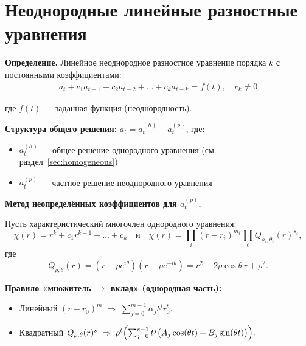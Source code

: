 \section{Неоднородные линейные разностные уравнения}\label{sec:inhomogeneous}

\begin{center}
\end{center}

\textbf{Определение.} Линейное неоднородное разностное уравнение порядка $k$ с постоянными коэффициентами:
\begin{align}
a_t + c_1 a_{t-1} + c_2 a_{t-2} + \dots + c_k a_{t-k} = f(t), \quad c_k \neq 0
\end{align}

где $f(t)$ — заданная функция (неоднородность).

\textbf{Структура общего решения:} $a_t = a_t^{(h)} + a_t^{(p)}$, где:
\begin{itemize}
\item $a_t^{(h)}$ — общее решение однородного уравнения (см. раздел~\ref{sec:homogeneous})
\item $a_t^{(p)}$ — частное решение неоднородного уравнения
\end{itemize}

\textbf{Метод неопределённых коэффициентов для $a_t^{(p)}$.}

Пусть характеристический многочлен однородного уравнения:
\[
\chi(r) = r^k + c_1 r^{k-1} + \dots + c_k
\quad \text{и} \quad
\chi(r) = \prod_i (r-r_i)^{m_i} \prod_\ell Q_{\rho_\ell, \theta_\ell}(r)^{s_\ell},
\]
где
\[
Q_{\rho,\theta}(r) = (r - \rho e^{i\theta})(r - \rho e^{-i\theta}) = r^2 - 2\rho \cos\theta \, r + \rho^2.
\]

\textbf{Правило «множитель $\to$ вклад» (однородная часть):}

\begin{itemize}
\item Линейный $(r-r_0)^m \;\Rightarrow\; \sum_{j=0}^{m-1} \alpha_j t^j r_0^t.$

\item Квадратный $Q_{\rho,\theta}(r)^s \;\Rightarrow\;
\rho^t \Bigl( \sum_{j=0}^{s-1} t^j \bigl(A_j \cos(\theta t) + B_j \sin(\theta t)\bigr)\Bigr).$
\end{itemize}

